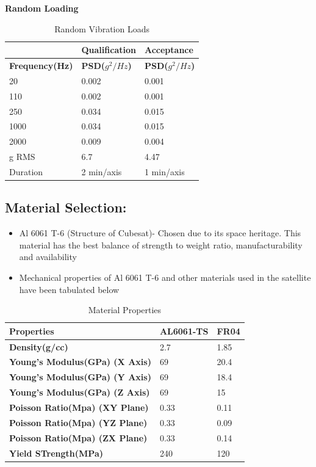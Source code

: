 \documentclass[../../main.tex]{subfiles}
\begin{document}
\textbf{Random Loading}

\begin{table}[H]
    \centering
    \begin{tabular}{ |p{3cm}|p{3cm}|p{3cm}| }
 \hline
    & \textbf{Qualification} & \textbf{Acceptance} \\
 \hline
\textbf{Frequency(Hz)} &  \textbf{PSD($g^2/Hz$)} &  \textbf{PSD($g^2/Hz$)} \\
\hline
20 & 0.002 & 0.001 \\
\hline
110 & 0.002 & 0.001 \\
\hline
250 & 0.034 & 0.015 \\
\hline
1000 & 0.034 & 0.015 \\
\hline
2000 & 0.009 & 0.004 \\
\hline
g RMS & 6.7 & 4.47 \\
\hline
Duration & 2 min/axis & 1 min/axis \\
\hline
 \end{tabular}
    \caption{Random Vibration Loads}
    \label{tab:my_label}
\end{table}
\subsection{Material Selection:}
\begin{itemize}
    \item Al 6061 T-6 (Structure of Cubesat)- Chosen due to its space heritage. This
material has the best balance of strength to weight ratio, manufacturability
and availability
    \item Mechanical properties of Al 6061 T-6 and other materials used in the satellite
have been tabulated below
\end{itemize}
    \begin{table}[h!]
        \centering
        \begin{tabular}{|p{7cm}|p{2.5cm}|p{2.5cm}|}
             \hline
             \textbf{Properties} & \textbf{AL6061-TS} & \textbf{FR04}\\
             \hline
             \textbf{Density(g/cc)} & 2.7 & 1.85 \\
             \hline
             \textbf{Young’s Modulus(GPa) (X Axis)} & 69 & 20.4 \\
             \hline
             \textbf{Young’s Modulus(GPa) (Y Axis)} & 69 & 18.4 \\
             \hline
             \textbf{Young’s Modulus(GPa) (Z Axis)} & 69 & 15 \\
             \hline
            \textbf{Poisson Ratio(Mpa) (XY Plane)} & 0.33 & 0.11 \\
            \hline
            \textbf{Poisson Ratio(Mpa) (YZ Plane)} & 0.33 & 0.09\\
            \hline
            \textbf{Poisson Ratio(Mpa) (ZX Plane)} & 0.33 & 0.14\\
            \hline
            \textbf{Yield STrength(MPa)} &240 &120\\
            \hline
        \end{tabular}
        \caption{Material Properties}
        \label{tab:my_label}
    \end{table}
\end{document}
